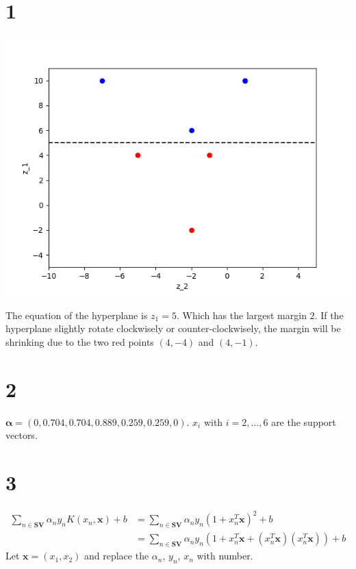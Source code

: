 \documentclass[12pt]{article}
\begin{document}
\maketitle


\section*{1}
\begin{center}
    \includegraphics[scale=0.5]{p1.png} 
\end{center}
The equation of the hyperplane is $z_1=5$. Which has the largest margin $2$.
If the hyperplane slightly rotate clockwisely or counter-clockwisely, the margin will be shrinking due to the two red points $(4, -4)$ and $(4, -1)$.

\section*{2}
$\bm{\alpha} = (0, 0.704, 0.704, 0.889, 0.259, 0.259, 0)$. $x_i$ with $i=2,...,6$ are the support vectors. 

\section*{3}
\begin{equation*}
\begin{split}
    \sum_{n\in \textbf{SV}} \alpha_n y_n K(x_n, \bm{x})+b 
    &= \sum_{n\in \textbf{SV}} \alpha_n y_n (1+x_n^T \bm{x})^2+b \\
    &= \sum_{n\in \textbf{SV}} \alpha_n y_n (1 +x_n^T \bm{x} + (x_n^T \bm{x})(x_n^T \bm{x}))+b
\end{split}
\end{equation*}
Let $\bm{x} = (x_1, x_2)$ and replace the $\alpha_n$, $y_n$, $x_n$ with number.
\end{document}
